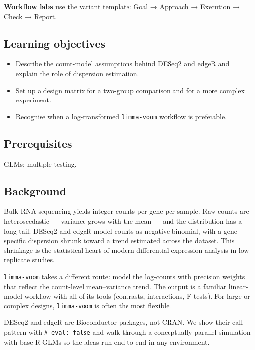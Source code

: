 \documentclass[
]{article}
\author{}
\date{\vspace{-2.5em}}
\providecommand{\tightlist}{%
  \setlength{\itemsep}{0pt}\setlength{\parskip}{0pt}}
\begin{document}
\textbf{Workflow labs} use the variant template: Goal → Approach →
Execution → Check → Report.

\subsection{Learning objectives}\label{learning-objectives}

\begin{itemize}
\tightlist
\item
  Describe the count-model assumptions behind DESeq2 and edgeR and
  explain the role of dispersion estimation.
\item
  Set up a design matrix for a two-group comparison and for a more
  complex experiment.
\item
  Recognise when a log-transformed \texttt{limma-voom} workflow is
  preferable.
\end{itemize}

\subsection{Prerequisites}\label{prerequisites}

GLMs; multiple testing.

\subsection{Background}\label{background}

Bulk RNA-sequencing yields integer counts per gene per sample. Raw
counts are heteroscedastic --- variance grows with the mean --- and the
distribution has a long tail. DESeq2 and edgeR model counts as
negative-binomial, with a gene-specific dispersion shrunk toward a trend
estimated across the dataset. This shrinkage is the statistical heart of
modern differential-expression analysis in low-replicate studies.

\texttt{limma-voom} takes a different route: model the log-counts with
precision weights that reflect the count-level mean--variance trend. The
output is a familiar linear-model workflow with all of its tools
(contrasts, interactions, F-tests). For large or complex designs,
\texttt{limma-voom} is often the most flexible.

DESeq2 and edgeR are Bioconductor packages, not CRAN. We show their call
pattern with \texttt{\#\textbar{}\ eval:\ false} and walk through a
conceptually parallel simulation with base R GLMs so the ideas run
end-to-end in any environment.
\end{document}
